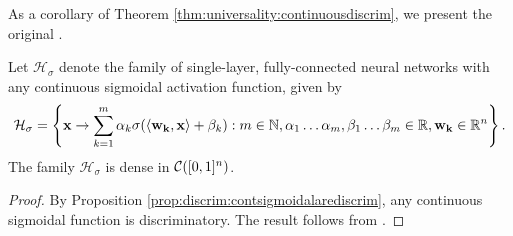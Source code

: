 As a corollary of Theorem \ref{thm:universality:continuousdiscrim}, we present the original .
\begin{theorem}
\label{thm:universality:cybenko}
Let $\mathcal{H}_{\sigma}$ denote the family of single-layer, fully-connected neural networks with any continuous sigmoidal activation function, given by \begin{align*}
\mathcal{H}_{\sigma} = \left \{ \mathbf{x} \to \sum_{k=1}^{m} \alpha_k \sigma{\left (\langle \mathbf{w_k}, \mathbf{x} \rangle + \beta_k \right)} : m \in {\mathbb N}, \alpha_1 \ldots \alpha_m, \beta_1 \ldots \beta_m \in {\mathbb R}, \mathbf{w_k} \in {\mathbb R}^n \right \}.
\end{align*}
The family $\mathcal{H}_{\sigma}$ is dense in ${\mathcal C}([0,1]^n)$.
\end{theorem}
\begin{proof}
By Proposition \ref{prop:discrim:contsigmoidalarediscrim}, any continuous sigmoidal function is discriminatory. The result follows from .
\end{proof}
